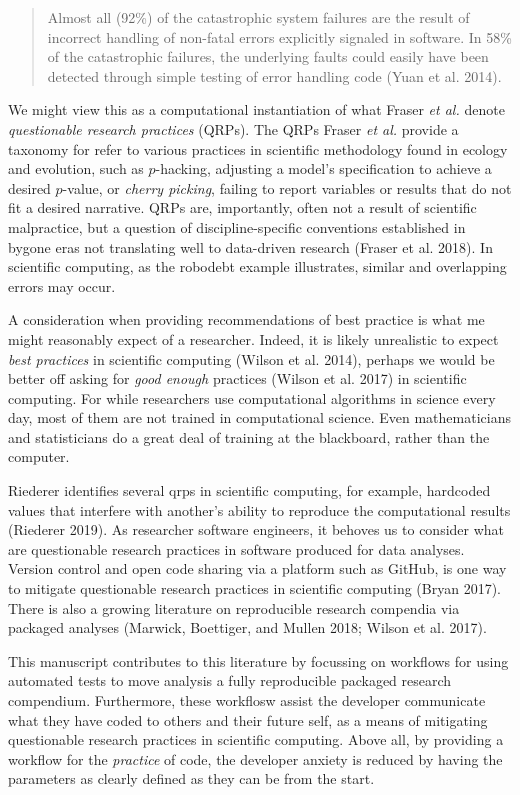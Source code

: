 \documentclass[
]{article}
\begin{document}
\begin{quote}
Almost all (92\%) of the catastrophic system failures are the result of
incorrect handling of non-fatal errors explicitly signaled in software.
In 58\% of the catastrophic failures, the underlying faults could easily
have been detected through simple testing of error handling code (Yuan
et al. 2014).
\end{quote}

We might view this as a computational instantiation of what Fraser
\emph{et al.} denote \emph{questionable research practices} (QRPs). The
QRPs Fraser \emph{et al.} provide a taxonomy for refer to various
practices in scientific methodology found in ecology and evolution, such
as \(p\)-hacking, adjusting a model's specification to achieve a desired
\(p\)-value, or \emph{cherry picking}, failing to report variables or
results that do not fit a desired narrative. QRPs are, importantly,
often not a result of scientific malpractice, but a question of
discipline-specific conventions established in bygone eras not
translating well to data-driven research (Fraser et al. 2018). In
scientific computing, as the robodebt example illustrates, similar and
overlapping errors may occur.

A consideration when providing recommendations of best practice is what
me might reasonably expect of a researcher. Indeed, it is likely
unrealistic to expect \emph{best practices} in scientific computing
(Wilson et al. 2014), perhaps we would be better off asking for
\emph{good enough} practices (Wilson et al. 2017) in scientific
computing. For while researchers use computational algorithms in science
every day, most of them are not trained in computational science. Even
mathematicians and statisticians do a great deal of training at the
blackboard, rather than the computer.

Riederer identifies several qrps in scientific computing, for example,
hardcoded values that interfere with another's ability to reproduce the
computational results (Riederer 2019). As researcher software engineers,
it behoves us to consider what are questionable research practices in
software produced for data analyses. Version control and open code
sharing via a platform such as GitHub, is one way to mitigate
questionable research practices in scientific computing (Bryan 2017).
There is also a growing literature on reproducible research compendia
via packaged analyses (Marwick, Boettiger, and Mullen 2018; Wilson et
al. 2017).

This manuscript contributes to this literature by focussing on workflows
for using automated tests to move analysis a fully reproducible packaged
research compendium. Furthermore, these workflosw assist the developer
communicate what they have coded to others and their future self, as a
means of mitigating questionable research practices in scientific
computing. Above all, by providing a workflow for the \emph{practice} of
code, the developer anxiety is reduced by having the parameters as
clearly defined as they can be from the start.
\end{document}
